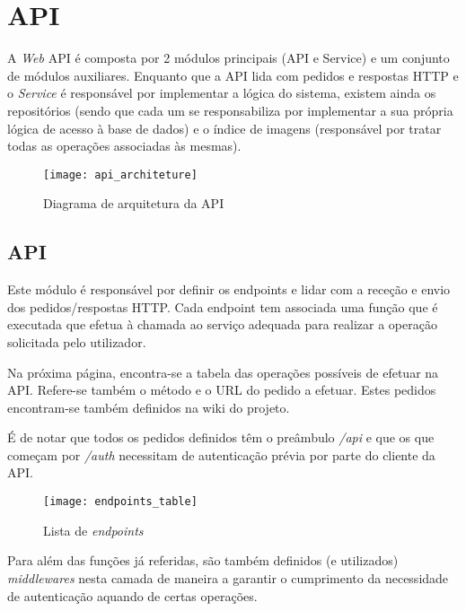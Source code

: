 \section{API}

A \textit{Web} API é composta por 2 módulos principais (API e Service) e um conjunto de módulos auxiliares. Enquanto que a API lida com pedidos e respostas HTTP e o \textit{Service} é responsável por implementar a lógica do sistema, existem ainda os repositórios (sendo que cada um se responsabiliza por implementar a sua própria lógica de acesso à base de dados) e o índice de imagens (responsável por tratar todas as operações associadas às mesmas).

\begin{figure}[h]
	\centering
	\texttt{[image: api\_architeture]}
	\caption{Diagrama de arquitetura da API}
\end{figure}

\subsection{API}
Este módulo é responsável por definir os endpoints e lidar com a receção e envio dos pedidos/respostas HTTP. Cada endpoint tem associada uma função que é executada que efetua à chamada ao serviço adequada para realizar a operação solicitada pelo utilizador. \par \medskip

Na próxima página, encontra-se a tabela das operações possíveis de efetuar na API. Refere-se também o método e o URL do pedido a efetuar. Estes pedidos encontram-se também definidos na wiki do projeto. \par \medskip

É de notar que todos os pedidos definidos têm o preâmbulo \textit{/api} e que os que começam por \textit{/auth} necessitam de autenticação prévia por parte do cliente da API. \par \medskip

\newpage

\begin{figure}[h]
	\centering
	\texttt{[image: endpoints\_table]}
	\caption{Lista de \textit{endpoints}}
\end{figure}

Para além das funções já referidas, são também definidos (e utilizados) \textit{middlewares} nesta camada de maneira a garantir o cumprimento da necessidade de autenticação aquando de certas operações. \medskip

